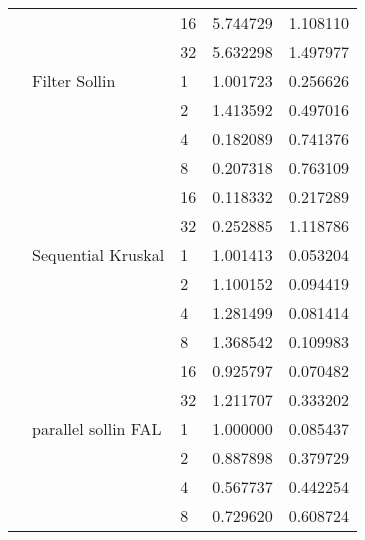 \begin{tabular}{lllrr}
                                                       &                     & 16 &  5.744729 &  1.108110 \\
                                                       &                     & 32 &  5.632298 &  1.497977 \\
                                                       & Filter Sollin & 1  &  1.001723 &  0.256626 \\
                                                       &                     & 2  &  1.413592 &  0.497016 \\
                                                       &                     & 4  &  0.182089 &  0.741376 \\
                                                       &                     & 8  &  0.207318 &  0.763109 \\
                                                       &                     & 16 &  0.118332 &  0.217289 \\
                                                       &                     & 32 &  0.252885 &  1.118786 \\
                                                       & Sequential Kruskal & 1  &  1.001413 &  0.053204 \\
                                                       &                     & 2  &  1.100152 &  0.094419 \\
                                                       &                     & 4  &  1.281499 &  0.081414 \\
                                                       &                     & 8  &  1.368542 &  0.109983 \\
                                                       &                     & 16 &  0.925797 &  0.070482 \\
                                                       &                     & 32 &  1.211707 &  0.333202 \\
                                                       & parallel sollin FAL & 1  &  1.000000 &  0.085437 \\
                                                       &                     & 2  &  0.887898 &  0.379729 \\
                                                       &                     & 4  &  0.567737 &  0.442254 \\
                                                       &                     & 8  &  0.729620 &  0.608724 \\

\end{tabular}
